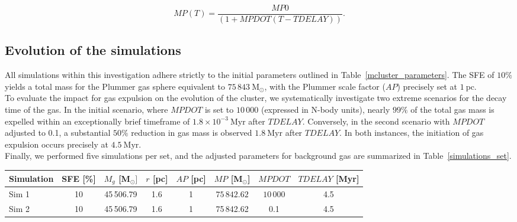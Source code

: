 \documentclass[baaa]{baaa}
\begin{document}
\begin{equation}
    MP(T) = \frac{MP0}{(1+MPDOT(T-TDELAY))}.
    \label{MP_time}
\end{equation}

\subsection{Evolution of the simulations}
All simulations within this investigation adhere strictly to the initial parameters outlined in Table~\ref{mcluster_parameters}. The {SFE} of $10 \%$ yields a total mass for the Plummer gas sphere equivalent to {$75\,843~\mathrm{M_\odot}$}, with the Plummer scale factor ($AP$) precisely set at $1~\mathrm{pc}$.\\
To evaluate the impact for gas expulsion on the evolution of the cluster, we systematically investigate two extreme scenarios for the decay time of the gas. In the initial scenario, where $MPDOT$ is set to $10\,000$ (expressed in N-body units), nearly $99 \%$ of the total gas mass is expelled within an exceptionally brief timeframe of {$1.8\times10^{-3}~\mathrm{Myr}$} after $TDELAY$. Conversely, in the second scenario with $MPDOT$ adjusted to 0.1, a substantial $50 \%$ reduction in gas mass is observed $1.8~\mathrm{Myr}$ after $TDELAY$. In both instances, the initiation of gas expulsion occurs precisely at $4.5~\mathrm{Myr}$.\\
Finally, we performed five simulations per set, and the adjusted parameters for background gas are summarized in Table~\ref{simulations_set}.

\begin{table*}[!t]
\centering
\caption{Summary of simulation sets, including gas potential.}
\begin{tabular}{lccccccc}
\hline\hline\noalign{\smallskip}
\!\!Simulation & \!\!\!\! {SFE} [\%] & \!\!\!\! $M_g$ [M$_\odot]$ & \!\!\!\! $r$ [pc] & \!\!\!\! $AP$ [pc] & \!\!\!\! $MP$ [M$_\odot$] & \!\!\!\! $MPDOT$ & \!\!\!\! $TDELAY$ [Myr]\\
\hline\noalign{\smallskip}
\!\!Sim 1 & 10 & 45\,506.79 & 1.6 & 1 & $75\,842.62$ & $10\,000$ & 4.5\\
\!\!Sim 2 & 10 & 45\,506.79 & 1.6 & 1 & 75\,842.62 & 0.1 & 4.5\\
\hline
\end{tabular}
\label{simulations_set}
\end{table*}
\end{document}
